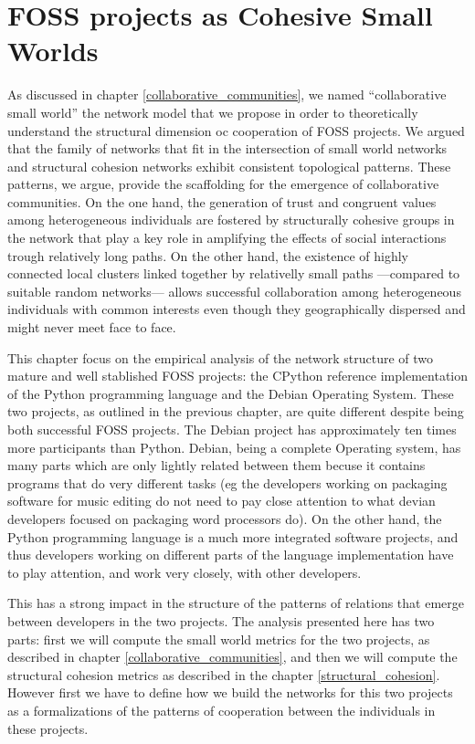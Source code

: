 \chapter{FOSS projects as Cohesive Small Worlds}
\label{cohesive_small_world}

As discussed in chapter \ref{collaborative_communities}, we named ``collaborative small world'' the network model that we propose in order to theoretically understand the structural dimension oc cooperation of FOSS projects. We argued that the family of networks that fit in the intersection of small world networks and structural cohesion networks exhibit consistent topological patterns. These patterns, we argue, provide the scaffolding for the emergence of collaborative communities. On the one hand, the generation of trust and congruent values among heterogeneous individuals are fostered by structurally cohesive groups in the network that play a key role in amplifying the effects of social interactions trough relatively long paths. On the other hand, the existence of highly connected local clusters linked together by relativelly small paths ---compared to suitable random networks--- allows successful collaboration among heterogeneous individuals with common interests even though they geographically dispersed and might never meet face to face.

This chapter focus on the empirical analysis of the network structure of two mature and well stablished FOSS projects: the CPython reference implementation of the Python programming language and the Debian Operating System. These two projects, as outlined in the previous chapter, are quite different despite being both successful FOSS projects. The Debian project has approximately ten times more participants than Python. Debian, being a complete Operating system, has many parts which are only lightly related between them becuse it contains programs that do very different tasks (eg the developers working on packaging software for music editing do not need to pay close attention to what devian developers focused on packaging word processors do). On the other hand, the Python programming language is a much more integrated software projects, and thus developers working on different parts of the language implementation have to play attention, and work very closely, with other developers.

This has a strong impact in the structure of the patterns of relations that emerge between developers in the two projects. The analysis presented here has two parts: first we will compute the small world metrics for the two projects, as described in chapter \ref{collaborative_communities}, and then we will compute the structural cohesion metrics as described in the chapter \ref{structural_cohesion}. However first we have to define how we build the networks for this two projects as a formalizations of the patterns of cooperation between the individuals in these projects.

